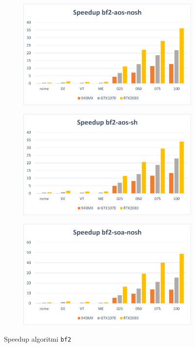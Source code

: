 \documentclass[12pt,a4paper,oneside]{book}
\begin{document}
	\begin{figure}[b]
		\centering
		\begin{subfigure}{.5\textwidth}
			\centering
			\includegraphics[width=\textwidth]{speedup_bf2-aos-nosh}
		\end{subfigure}%
		\begin{subfigure}{.5\textwidth}
			\centering
			\includegraphics[width=\textwidth]{speedup_bf2-aos-sh}
		\end{subfigure}
		\begin{subfigure}{.5\textwidth}
			\centering
			\includegraphics[width=\textwidth]{speedup_bf2-soa-nosh}
		\end{subfigure}%
		\caption{Speedup algoritmi \texttt{bf2}}
		\label{fig:speedup_bf2}
	\end{figure}
	
\end{document}

